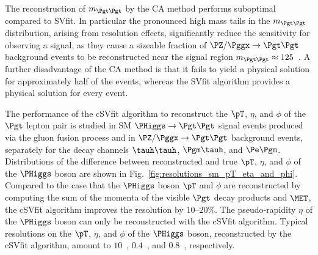 The reconstruction of $m_{\Pgt\Pgt}$ by the CA method performs suboptimal compared to SVfit.
In particular the pronounced high mass tails in the $m_{\Pgt\Pgt}$ distribution, arising from resolution effects,
significantly reduce the sensitivity for observing a signal,
as they cause a sizeable fraction of $\PZ/\Pggx \to \Pgt\Pgt$ background events
to be reconstructed near the signal region $m_{\Pgt\Pgt} \approx 125$~\GeV.
A further disadvantage of the CA method is that it fails to yield a physical solution for approximately half of the events,
whereas the SVfit algorithm provides a physical solution for every event. 

The performance of the cSVfit algorithm to reconstruct the $\pT$,
$\eta$, and $\phi$ of the $\Pgt$ lepton pair is studied in SM $\PHiggs
\to \Pgt\Pgt$ signal events produced via the gluon fusion process
and in $\PZ/\Pggx \to \Pgt\Pgt$ background events,
separately for the decay channels $\tauh\tauh$, $\Pgm\tauh$, and $\Pe\Pgm$.
Distributions of the difference between reconstructed and true $\pT$,
$\eta$, and $\phi$ of the $\PHiggs$ boson are shown in
Fig.~\ref{fig:resolutions_sm_pT_eta_and_phi}.
Compared to the case that the $\PHiggs$ boson $\pT$ and $\phi$ are
reconstructed by computing the sum of the momenta of the visible $\Pgt$
decay products and $\MET$, the cSVfit algorithm improves the
resolution by $10$--$20\%$. The pseudo-rapidity $\eta$ of the
$\PHiggs$ boson can only be reconstructed with the cSVfit algorithm.
Typical resolutions on the $\pT$, $\eta$, and $\phi$ of the $\PHiggs$ boson,
reconstructed by the cSVfit algorithm, amount to $10$~\GeV, $0.4$~\rad, and $0.8$~\rad,
respectively.

%
%

